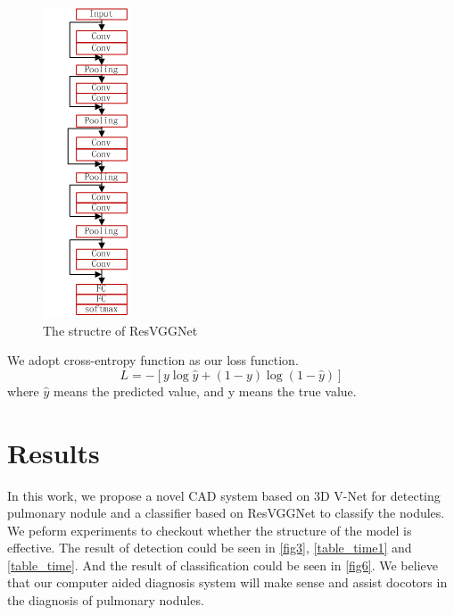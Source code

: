 \documentclass[conference]{IEEEtran}
\begin{document}
\begin{figure}[htbp]
    \centerline{\includegraphics[scale=0.8]{ResVGGNet.png}}
    \caption{The structre of ResVGGNet}
    \label{fig4}
    \end{figure}
We adopt cross-entropy function as our loss function.
\begin{equation}L=-\left[y \log \hat{y}+(1-y) \log \left(1-\hat{y}\right)\right]\end{equation}
where $\hat{y}$ means the predicted value, and y means the true value.
\section{Results}
In this work, we propose a novel CAD system based on 3D V-Net for detecting pulmonary nodule and a classifier based on ResVGGNet to classify the nodules.
We peform experiments to checkout whether the structure of the model is effective.
The result of detection could be seen in \ref{fig3}, \ref{table_time1} and \ref{table_time}. And the result of classification could be seen in \ref{fig6}.
We believe that our computer aided diagnosis system will make sense and assist docotors in the diagnosis of pulmonary nodules.
\end{document}
